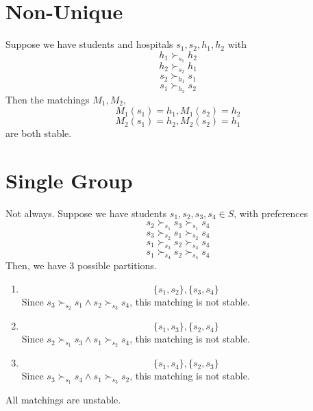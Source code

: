 \newpage
\section{Non-Unique}
Suppose we have students and hospitals $s_1,s_2,h_1,h_2$ with
\[h_1\succ_{s_1}h_2\]
\[h_2\succ_{s_2}h_1\]
\[s_2\succ_{h_1}s_1\]
\[s_1\succ_{h_2}s_2\]
Then the matchings $M_1,M_2$,
\[M_1(s_1)=h_1, M_1(s_2)=h_2\]
\[M_2(s_1)=h_2, M_2(s_2)=h_1\]
are both stable.

\newpage
\section{Single Group}
Not always. Suppose we have students $s_1,s_2,s_3,s_4\in S$,
with preferences
\[s_2\succ_{s_1}s_3\succ_{s_1}s_4\]
\[s_3\succ_{s_2}s_1\succ_{s_2}s_4\]
\[s_1\succ_{s_3}s_2\succ_{s_3}s_4\]
\[s_1\succ_{s_4}s_2\succ_{s_4}s_4\]
Then, we have 3 possible partitions.
\begin{enumerate}
    \item \[\{s_1,s_2\},\{s_3,s_4\}\]
    Since $s_3\succ_{s_2}s_1 \wedge s_2\succ_{s_3}s_4$,
    this matching is not stable.
    \item \[\{s_1,s_3\},\{s_2,s_4\}\]
    Since $s_2\succ_{s_1}s_3 \wedge s_1\succ_{s_2}s_4$,
    this matching is not stable.
    \item \[\{s_1,s_4\},\{s_2,s_3\}\]
    Since $s_3\succ_{s_1}s_4 \wedge s_1\succ_{s_3}s_2$,
    this matching is not stable.
\end{enumerate}
All matchings are unstable.

